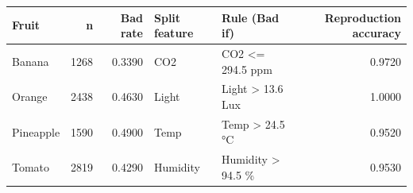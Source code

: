 \begin{tabular}{lrrllr}
\toprule
Fruit & n & Bad rate & Split feature & Rule (Bad if) & Reproduction accuracy \\
\midrule
Banana & 1268 & 0.3390 & CO2 & CO2 <= 294.5 ppm & 0.9720 \\
Orange & 2438 & 0.4630 & Light & Light > 13.6 Lux & 1.0000 \\
Pineapple & 1590 & 0.4900 & Temp & Temp > 24.5 °C & 0.9520 \\
Tomato & 2819 & 0.4290 & Humidity & Humidity > 94.5 \% & 0.9530 \\
\bottomrule
\end{tabular}
